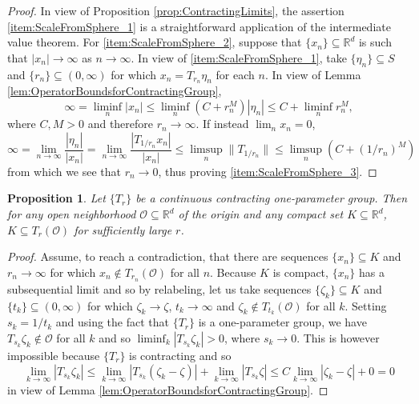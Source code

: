 \documentclass[11pt]{article}
\newtheorem{proposition}[theorem]{Proposition}
\theoremstyle{remark}
\begin{document}
\begin{proof}
In view of Proposition \ref{prop:ContractingLimits}, the assertion \ref{item:ScaleFromSphere_1} is a straightforward application of the intermediate value theorem. For \ref{item:ScaleFromSphere_2}, suppose that $\{x_n\}\subseteq\mathbb{R}^d$ is such that $|x_n|\rightarrow \infty$ as $n\rightarrow\infty$. In view of \ref{item:ScaleFromSphere_1}, take $\{\eta_n\}\subseteq S$ and $\{r_n\}\subseteq (0,\infty)$ for which $x_n=T_{r_n}\eta_n$ for each $n$. In view of Lemma \ref{lem:OperatorBoundsforContractingGroup},
\begin{equation*}
\infty=\liminf_n |x_n|\leq\liminf_n \left(C+r_n^M\right)|\eta_n|\leq C+\liminf_n r_n^M,
\end{equation*}
where $C,M>0$ and therefore $r_n\rightarrow\infty$. If instead $\lim_n x_n=0$,
\begin{equation*}
\infty=\lim_{n\rightarrow\infty}\frac{|\eta_n|}{|x_n|}=\lim_{n\rightarrow\infty}\frac{|T_{1/r_n}x_n|}{|x_n|}\leq\limsup_n\|T_{1/r_n}\|\leq\limsup_n(C+(1/r_n)^M)
\end{equation*}
from which we see that $r_n\rightarrow 0$, thus proving \ref{item:ScaleFromSphere_3}.
\end{proof}


\begin{proposition}\label{prop:ContractingCapturesCompact}
Let $\{T_r\}$ be a continuous contracting one-parameter group. Then for any open neighborhood $\mathcal{O}\subseteq\mathbb{R}^d$ of the origin and any compact set $K\subseteq\mathbb{R}^d$, $K\subseteq T_r(\mathcal{O})$ for sufficiently large $r$.
\end{proposition}
\begin{proof}
Assume, to reach a contradiction, that there are sequences $\{x_n\}\subseteq K$ and $r_n\rightarrow\infty$ for which $x_n\notin T_{r_n}(\mathcal{O})$ for all $n$. Because $K$ is compact, $\{x_n\}$ has a subsequential limit and so by relabeling, let us take sequences $\{\zeta_k\}\subseteq K$ and $\{t_k\}\subseteq (0,\infty)$ for which $\zeta_k\rightarrow \zeta$, $t_k\rightarrow\infty$ and $\zeta_k\notin T_{t_k}(\mathcal{O})$ for all $k$. Setting $s_k=1/t_k$ and using the fact that $\{T_r\}$ is a one-parameter group, we have $T_{s_k}\zeta_k\notin\mathcal{O}$ for all $k$ and so $\liminf_{k}|T_{s_k}\zeta_k|>0$, where $s_k\rightarrow 0$. This is however impossible because $\{T_r\}$ is contracting and so
\begin{equation*}
\lim_{k\rightarrow\infty}|T_{s_k}\zeta_k|\leq\lim_{k\rightarrow \infty}|T_{s_k}(\zeta_k-\zeta)|+\lim_{k\rightarrow\infty}|T_{s_k}\zeta|\leq C\lim_{k\rightarrow\infty}|\zeta_k-\zeta|+0=0
\end{equation*}
in view of Lemma \ref{lem:OperatorBoundsforContractingGroup}.
\end{proof}
\end{document}
